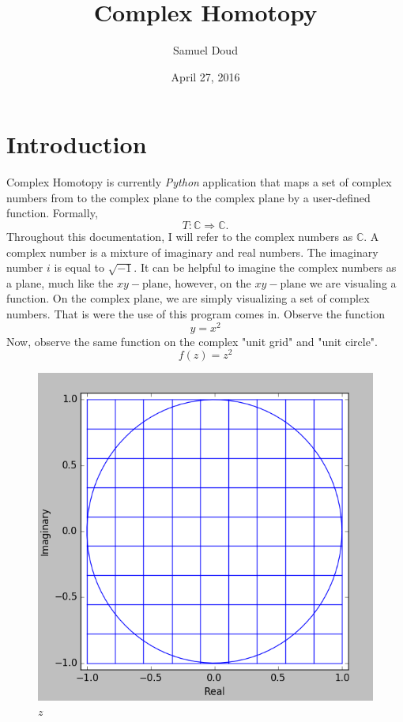 \documentclass{article}
\title{Complex Homotopy}
\author{Samuel Doud}
\date{April 27, 2016}
\begin{document}
\maketitle

\section{Introduction}
    Complex Homotopy is currently \textit{Python} application that maps a set of complex numbers from to the complex plane to the complex plane by a user-defined function. Formally,
    $$T:\mathbb{C}\Rightarrow \mathbb{C}.$$
    Throughout this documentation, I will refer to the complex numbers as $\mathbb{C}$. A complex number is a mixture of imaginary and real numbers. The imaginary number $i$ is equal to $\sqrt{-1}$. It can be helpful to imagine the complex numbers as a plane, much like the $xy-\text{plane}$, however, on the $xy-\text{plane}$ we are visualing a function. On the complex plane, we are simply visualizing a set of complex numbers. That is were the use of this program comes in.
    Observe the function 
    $$y=x^{2}$$
    Now, observe the same function on the complex "unit grid" and "unit circle".
    $$f(z) = z^{2}$$
    \begin{figure}[H]
        \centering
        \includegraphics[scale=.5]{z}
        \caption{$z$}
        \label{fig:my_label}
    \end{figure}
\end{document}
